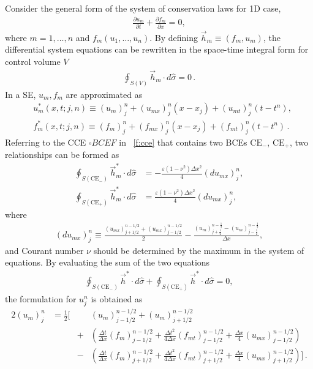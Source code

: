 \documentclass[letterpaper,12pt,dvips]{article}
\numberwithin{equation}{section}
\begin{document}
Consider the general form of the system of conservation laws for 1D case, 
\begin{align}
  \frac{\partial u_m}{\partial t} + \frac{\partial f_m}{\partial x} = 0
    , \label{e:syswave}
\end{align}
where $m=1,\ldots,n$ and $f_m(u_1,\ldots,u_n)$.
By defining $\vec{h}_m\equiv(f_m,u_m)$, the differential system equations
can be rewritten in the space-time integral form for control volume $V$
\begin{align*}
\oint_{S(V)}\vec{h}_m\cdot d\hat{\sigma} = 0\,.
\end{align*}
In a SE, $u_m, f_m$ are approximated as 
\begin{align*}
  & u_m^*(x,t;j,n) \equiv (u_m)_j^n + (u_{mx})_j^n(x-x_j)
                        + (u_{mt})_j^n(t-t^n), \\
  & f_m^*(x,t;j,n) \equiv (f_m)_j^n + (f_{mx})_j^n(x-x_j)
                        + (f_{mt})_j^n(t-t^n)  \,.
\end{align*}
Referring to the CCE $\square BCEF$ in \figurename~\ref{f:cce} that 
contains two BCEs $\mathrm{CE}_-$, $\mathrm{CE}_+$, two relationships 
can be formed as
\begin{align*}
  \oint_{S(\mathrm{CE}_-)} \vec{h}_m^*\cdot d\hat{\sigma} &= 
    -\frac{\varepsilon(1-\nu^2)\Delta x^2}{4}(du_{mx})_j^n, \\
  \oint_{S(\mathrm{CE}_+)} \vec{h}_m^*\cdot d\hat{\sigma} &= 
    \frac{\varepsilon(1-\nu^2)\Delta x^2}{4}(du_{mx})_j^n, 
\end{align*}
where
\begin{align}
  (du_{mx})_j^n 
    \equiv \frac{(u_{mx})_{j+1/2}^{n-1/2} 
                + (u_{mx})_{j-1/2}^{n-1/2}}{2}
  - \frac{(u_m)_{j+\frac{1}{2}}^{n-\frac{1}{2}}
        - (u_m)_{j-\frac{1}{2}}^{n-\frac{1}{2}}}
         {\Delta x}, \label{e:dumx}
\end{align}
and Courant number $\nu$ should be determined by the maximum in the system 
of equations.
By evaluating the sum of the two equations
\begin{align*}
    \oint_{S(\mathrm{CE}_-)} \vec{h}^*\cdot d\hat{\sigma} 
  + \oint_{S(\mathrm{CE}_+)} \vec{h}^*\cdot d\hat{\sigma} = 0, 
\end{align*}
the formulation for $u_j^n$ is obtained as 
\begin{alignat*}{2}
  (u_m)_j^n &= \frac{1}{2}\Big[
      &&(u_m)_{j-1/2}^{n-1/2}+(u_m)_{j+1/2}^{n-1/2} \\
  & &+ &\left( 
        \frac{\Delta t}{\Delta x}(f_m)_{j-1/2}^{n-1/2} 
      + \frac{\Delta t^2}{4\Delta x}(f_{mt})_{j-1/2}^{n-1/2}
      + \frac{\Delta x}{4}(u_{mx})_{j-1/2}^{n-1/2} 
      \right) \\
  & &- &\left( 
        \frac{\Delta t}{\Delta x}(f_m)_{j+1/2}^{n-1/2} 
      + \frac{\Delta t^2}{4\Delta x}(f_{mt})_{j+1/2}^{n-1/2}
      + \frac{\Delta x}{4}(u_{mx})_{j+1/2}^{n-1/2} 
      \right) 
    \Big]\,.
\end{alignat*}
\end{document}
